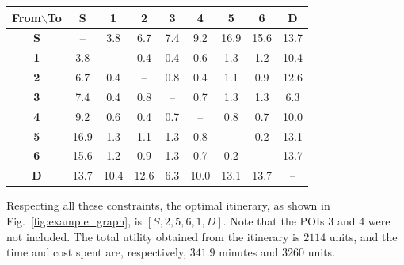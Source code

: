 \begin{table}[t]
	\centering
	\resizebox{0.97\columnwidth}{!}
	{
		\begin{tabular}{c|cccccccc}
			\toprule
			\textbf{From$\backslash$To} & \textbf{S} & \textbf{1} & \textbf{2} & \textbf{3} & \textbf{4} & \textbf{5} & \textbf{6} & \textbf{D} \\
			\midrule
			\textbf{S} & --    & 3.8  & 6.7  & 7.4  & 9.2  & 16.9 & 15.6 & 13.7 \\
			\textbf{1} & 3.8   & --   & 0.4  & 0.4  & 0.6  & 1.3  & 1.2  & 10.4 \\
			\textbf{2} & 6.7   & 0.4  & --   & 0.8  & 0.4  & 1.1  & 0.9  & 12.6 \\
			\textbf{3} & 7.4   & 0.4  & 0.8  & --   & 0.7  & 1.3  & 1.3  & 6.3  \\
			\textbf{4} & 9.2   & 0.6  & 0.4  & 0.7  & --   & 0.8  & 0.7  & 10.0 \\
			\textbf{5} & 16.9  & 1.3  & 1.1  & 1.3  & 0.8  & --   & 0.2  & 13.1 \\
			\textbf{6} & 15.6  & 1.2  & 0.9  & 1.3  & 0.7  & 0.2  & --   & 13.7 \\
			\textbf{D} & 13.7  & 10.4 & 12.6 & 6.3  & 10.0 & 13.1 & 13.7 & --   \\
			\bottomrule
		\end{tabular}
	}
	\label{tab:example_taxi}
\end{table}

Respecting all these constraints, the optimal itinerary,
as shown in Fig.~\ref{fig:example_graph},  is $[S, 2, 5, 6, 1, D]$.
Note that the
POIs 3 and 4 were not included.  The total utility obtained from the
itinerary is $2114$ units, and the time and cost spent 
are, respectively, $341.9$ minutes and $3260$ units.



